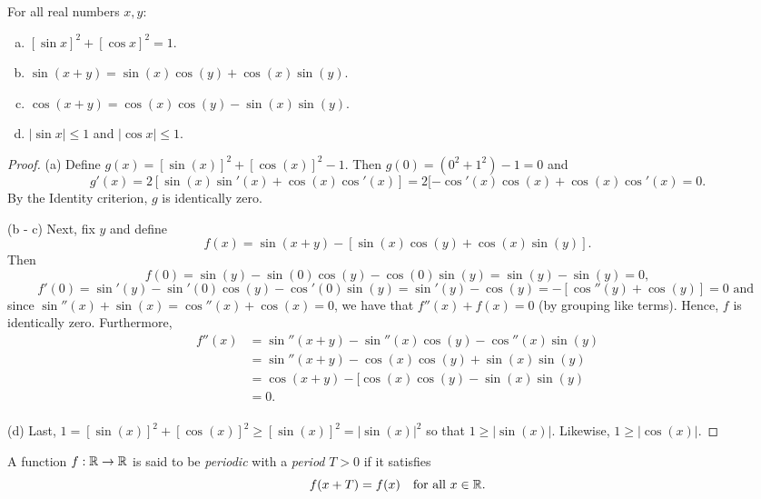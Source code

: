 \documentclass[letterpaper, twoside, 12pt]{book}
\begin{document}
\begin{theorem}[5.6]
  For all real numbers \(x,y\):
  \begin{enumerate}[(a)]
    \item \([\sin x]^2+[\cos x]^2=1\).
    \item \(\sin(x+y)=\sin(x)\cos(y)+\cos(x)\sin(y)\).
    \item \(\cos(x+y)=\cos(x)\cos(y)-\sin(x)\sin(y)\).
    \item \(|\sin x|\leq 1\) and \(|\cos x|\leq 1\).
  \end{enumerate}
\end{theorem}

\begin{proof}

    (a) Define \(g(x) = [\sin(x)]^2 + [\cos(x)]^2 - 1 \). Then
    \(g(0) = (0^2 + 1^2) - 1 = 0\) and 
    \[ g'(x) = 2[ \sin(x)\sin'(x) + \cos(x)\cos'(x)] = 
        2[ -\cos'(x)\cos(x) + \cos(x)\cos'(x)  = 0 .\]
    By the Identity criterion, \(g\) is identically zero.

    (b - c) Next, fix \(y\) and define 
    \[ f(x) = \sin(x + y) - [\sin(x)\cos(y) + \cos(x)\sin(y)]. \]
    Then 
    \[f(0) = \sin(y) - \sin(0)\cos(y) - \cos(0)\sin(y) = \sin(y) - \sin(y) = 0 ,\]
    \[f'(0) = \sin'(y) - \sin'(0)\cos(y) - \cos'(0)\sin(y)  = \sin'(y) - \cos(y) = - [ \cos''(y) + \cos(y)] = 0 \text{~and~} \]
    since \(\sin''(x) + \sin(x) = \cos''(x) + \cos(x) = 0\), we have that
    \(f''(x) + f(x) = 0\) (by grouping like terms).
    Hence, \(f\) is identically zero. Furthermore, 
    \begin{align*}
        f''(x) &= \sin''(x + y) - \sin''(x)\cos(y) - \cos''(x)\sin(y) \\ 
               &= \sin''(x + y) - \cos(x)\cos(y) + \sin(x)\sin(y) \\
               &= \cos(x + y) - [\cos(x)\cos(y) - \sin(x)\sin(y) \\
               &= 0 .\\
    \end{align*}

    (d) Last, \(1 = [\sin(x)]^2 + [\cos(x)]^2 \geq [\sin(x)]^2 = |\sin(x)|^2 \) so
    that \(1 \geq |\sin(x)|\). Likewise, \(1 \geq |\cos(x)| \).
\end{proof}


\begin{definition}
  A function \(f:\mathbb R\to\mathbb R\) is said to be \textit{periodic} with
  a \textit{period} \(T>0\) if it satisfies
  \[
    f(x+T)=f(x)
    ~~~\text{for all }x\in\mathbb R
  .\]
\end{definition}
\end{document}
